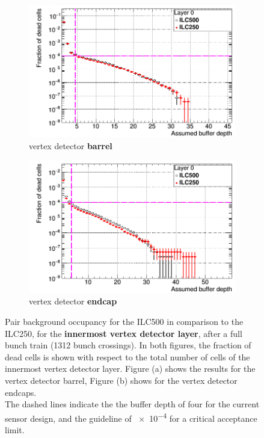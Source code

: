 \begin{figure}
 \centering
  \begin{subfigure}[b]{0.49\textwidth}
   \centering
    \includegraphics[width=\textwidth]{Figures/Pairs/Occupancy_Comparison_Layer_0_deadcells_ILC500vsILC250_SiVertexBarrel_corrected_Barrel_size.png}
   \caption{\sid vertex detector \textbf{barrel}}
   \end{subfigure}
   \hfill
    \begin{subfigure}[b]{0.49\textwidth}
   \centering
    \includegraphics[width=\textwidth]{Figures/Pairs/Occupancy_Comparison_Layer_0_deadcells_ILC500vsILC250_SiVertexEndcap.png}
   \caption{\sid vertex detector \textbf{endcap}}
   \end{subfigure}
   \caption[Pair background occupancy in the \sid vertex detector for the ILC500 and the ILC250]{Pair background occupancy for the ILC500 in comparison to the ILC250, for the \textbf{innermost \sid vertex detector layer}, after a full bunch train (\num{1312} bunch crossings).
   In both figures, the fraction of dead cells is shown with respect to the total number of cells of the innermost vertex detector layer.
   Figure (a) shows the results for the vertex detector barrel, Figure (b) shows for the vertex detector endcaps.
   \\The dashed lines indicate the the buffer depth of four for the current sensor design, and the guideline of \num{e-4} for a critical acceptance limit.
   }
   \label{fig:PairBkg:ILC500-ILC250_Occupancy}
\end{figure}
